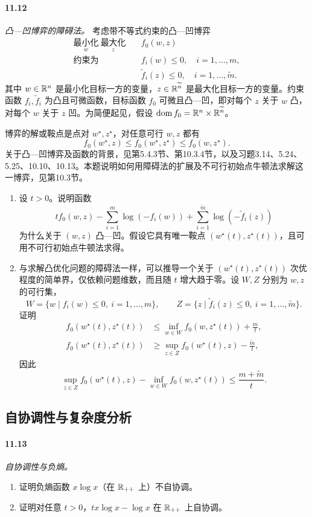 \paragraph{11.12} \emph{凸—凹博弈的障碍法。} 考虑带不等式约束的凸—凹博弈
\[
\begin{aligned}
\underset{w}{\text{最小化}}\ \underset{z}{\text{最大化}}\quad&f_0(w,z)\\
\text{约束为}\quad&f_i(w)\le0,\quad i=1,\ldots,m,\\
&\widetilde f_i(z)\le0,\quad i=1,\ldots,\widetilde m.
\end{aligned}
\]
其中 $w\in\mathbb R^n$ 是最小化目标一方的变量，$z\in\mathbb R^{\widetilde n}$ 是最大化目标一方的变量。约束函数 $f_i,\widetilde f_i$ 为凸且可微函数，目标函数 $f_0$ 可微且凸—凹，即对每个 $z$ 关于 $w$ 凸，对每个 $w$ 关于 $z$ 凹。为简便起见，假设 $\operatorname{dom} f_0=\mathbb R^n\times\mathbb R^{\widetilde n}$。

博弈的解或鞍点是点对 $w^\star,z^\star$，对任意可行 $w,z$ 都有
\[
f_0(w^\star,z)\le f_0(w^\star,z^\star)\le f_0(w,z^\star).
\]
关于凸—凹博弈及函数的背景，见第5.4.3节、第10.3.4节，以及习题3.14、5.24、5.25、10.10、10.13。本题说明如何用障碍法的扩展及不可行初始点牛顿法求解这一博弈，见第10.3节。
\begin{enumerate}
\item[(a)] 设 $t>0$。说明函数
\[
tf_0(w,z)-\sum_{i=1}^m\log(-f_i(w))+\sum_{i=1}^{\widetilde m}\log(-\widetilde f_i(z))
\]
为什么关于 $(w,z)$ 凸—凹。假设它具有唯一鞍点 $(w^\star(t),z^\star(t))$，且可用不可行初始点牛顿法求得。
\item[(b)] 与求解凸优化问题的障碍法一样，可以推导一个关于 $(w^\star(t),z^\star(t))$ 次优程度的简单界，仅依赖问题维数，而且随 $t$ 增大趋于零。设 $W,Z$ 分别为 $w,z$ 的可行集，
\[
W=\{w\mid f_i(w)\le0,\ i=1,\ldots,m\},\qquad
Z=\{z\mid\widetilde f_i(z)\le0,\ i=1,\ldots,\widetilde m\}.
\]
证明
\begin{align*}
f_0(w^\star(t),z^\star(t))&\le\inf_{w\in W}f_0(w,z^\star(t))+\frac mt,\\
f_0(w^\star(t),z^\star(t))&\ge\sup_{z\in Z}f_0(w^\star(t),z)-\frac{\widetilde m}t,
\end{align*}
因此
\[
\sup_{z\in Z}f_0(w^\star(t),z)-\inf_{w\in W}f_0(w,z^\star(t))\le\frac{m+\widetilde m}t.
\]
\end{enumerate}

\subsection*{自协调性与复杂度分析}
\paragraph{11.13} \emph{自协调性与负熵。}
\begin{enumerate}
\item[(a)] 证明负熵函数 $x\log x$（在 $\mathbb R_{++}$ 上）不自协调。
\item[(b)] 证明对任意 $t>0$，$tx\log x-\log x$ 在 $\mathbb R_{++}$ 上自协调。
\end{enumerate}

